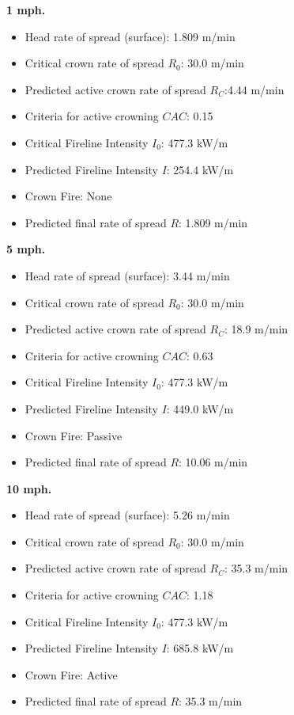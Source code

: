 \textbf{1 mph.}
\begin{itemize}
    \item Head rate of spread (surface): 1.809 m/min
    \item Critical crown rate of spread $R_0$: 30.0 m/min
    \item Predicted active crown rate of spread $R_C$:4.44 m/min
    \item Criteria for active crowning $CAC$: 0.15 
    \item Critical Fireline Intensity $I_0$: 477.3 kW/m
    \item Predicted Fireline Intensity $I$: 254.4 kW/m
    \item Crown Fire: None
    \item Predicted final rate of spread $R$: 1.809 m/min 
\end{itemize}

\textbf{5 mph.}
\begin{itemize}
    \item Head rate of spread (surface): 3.44 m/min
    \item Critical crown rate of spread $R_0$: 30.0 m/min
    \item Predicted active crown rate of spread $R_C$: 18.9 m/min
    \item Criteria for active crowning $CAC$: 0.63 
    \item Critical Fireline Intensity $I_0$: 477.3 kW/m
    \item Predicted Fireline Intensity $I$: 449.0 kW/m
    \item Crown Fire: Passive
    \item Predicted final rate of spread $R$: 10.06 m/min 
\end{itemize}

\textbf{10 mph.}
\begin{itemize}
    \item Head rate of spread (surface): 5.26 m/min
    \item Critical crown rate of spread $R_0$: 30.0 m/min
    \item Predicted active crown rate of spread $R_C$: 35.3 m/min
    \item Criteria for active crowning $CAC$: 1.18 
    \item Critical Fireline Intensity $I_0$: 477.3 kW/m
    \item Predicted Fireline Intensity $I$: 685.8 kW/m
    \item Crown Fire: Active
    \item Predicted final rate of spread $R$: 35.3 m/min 
\end{itemize}

